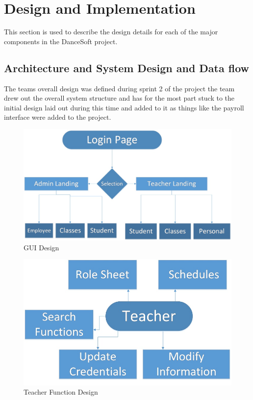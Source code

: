 
\chapter{Design  and Implementation}
This section is used to describe the design details for each of the major components 
in the DanceSoft project.
  
 
 \section{Architecture and System Design and Data flow }
 The teams overall design was defined during sprint 2 of the project the team drew out the overall system structure and has for the most part stuck to the initial design laid out during this time and added to it as things like the payroll interface were added to the project.
 
\begin{figure}
  \includegraphics[width=\linewidth]{pics/GUI_digram.jpg}
  \caption{GUI Design}
  \label{fig:GUI Design}
\end{figure}

\begin{figure}
  \includegraphics[width=\linewidth]{pics/TeacherFunctions.jpg}
  \caption{Teacher Function Design}
  \label{fig: Teacher Functions}
\end{figure}


